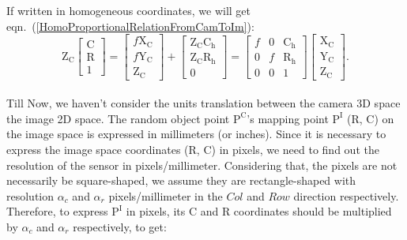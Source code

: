 \noindent
If written in homogeneous coordinates, we will get eqn.~(\ref{HomoProportionalRelationFromCamToIm}):
\begin{equation}
%
\text{Z}_\text{C} \left[ \begin{array}{c} \text{C} \\ \text{R} \\ 1 \end{array} \right] %
= %
\left[ \begin{array}{c} f\text{X}_\text{C} \\ f\text{Y}_\text{C} \\ \text{Z}_\text{C} \end{array} \right]%
+
\left[ \begin{array}{c}  \text{Z}_\text{C}\text{C}_\text{h} \\  \text{Z}_\text{C}\text{R}_\text{h} \\ 0\end{array} \right] %
=  \begin{bmatrix} f & 0 &  \text{C}_\text{h}  \\ 0 & f & \text{R}_\text{h} \\ 0 & 0 & 1 \end{bmatrix}%
\left[ \begin{array}{c} \text{X}_\text{C} \\ \text{Y}_\text{C} \\ \text{Z}_\text{C} \end{array} \right] .%
\label{HomoProportionalRelationFromCamToIm}
\end{equation}%
%
\\\indent
Till Now, we haven't consider the units translation between the camera 3D space the image 2D space. The random object point \(\text{P}^\text{C}\)'s mapping point \(\text{P}^\text{I}\) (R, C) on the image space is expressed in millimeters (or inches). Since it is necessary to express the image space coordinates (R, C) in pixels, we need to find out the resolution of the sensor in pixels/millimeter. Considering that, the pixels are not necessarily be square-shaped, we assume they are rectangle-shaped with resolution  $\alpha_c$ and \(\alpha_r\) pixels/millimeter in the \(Col\) and \(Row\) direction respectively. Therefore, to express \(\text{P}^\text{I}\) in pixels, its C and R coordinates should be multiplied by \(\alpha_c\) and \(\alpha_r\) respectively, to get:
%
